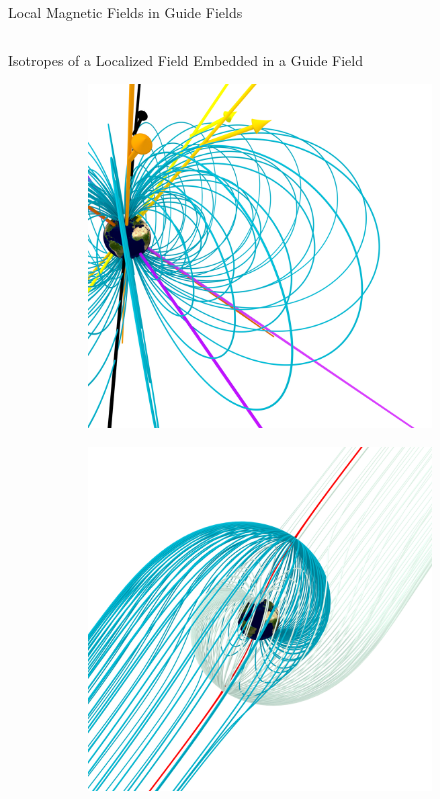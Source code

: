 \documentclass[final]{beamer}
\newlength{\onecolwid}
\newlength{\twocolwid}
\begin{document}
\begin{frame}[t]
\begin{columns}[t]
\begin{column}{\twocolwid}
\begin{block}{\huge{Local Magnetic Fields in Guide Fields}}
\begin{columns}[t,totalwidth=\twocolwid]
\begin{column}{\onecolwid}
\begin{block}{Isotropes of a Localized Field Embedded in a Guide Field}
  \begin{figure}
    \centering
    \begin{subfigure}[b]{.45\textwidth}
      \includegraphics[width=\textwidth]{fig/mainfig.png}
      \caption{}
    \end{subfigure}
    \begin{subfigure}[b]{.45\textwidth}
      \includegraphics[width=\textwidth]{fig/separatrix_dipole.png}

\end{subfigure}
\end{figure}
\end{block}
\end{column}
\end{columns}
\end{block}
\end{column}
\end{columns}
\end{frame}
\end{document}
